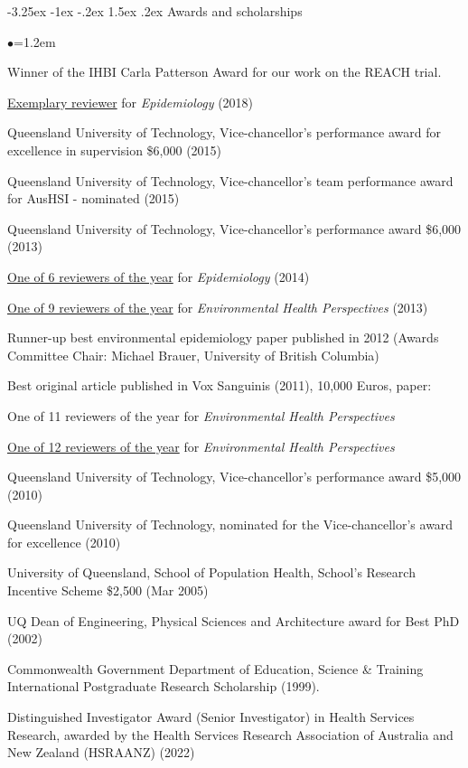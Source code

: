 \documentclass[a4paper,11pt]{article}
\makeatletter
\renewcommand\subsection{\@startsection{subsection}{2}{\z@}%
                                       {-3.25ex \@plus -1ex \@minus -.2ex}%
                                       {1.5ex \@plus .2ex}%
                                   {\normalfont\normalsize\bfseries\color{blue}}}
\renewcommand{\labelitemi}{$\bullet$}
\makeatother
\begin{document}
\begin{raggedright}
\subsection{Awards and scholarships}
\begin{list}{\labelitemi}{\leftmargin=1.2em}\addtolength{\itemsep}{-0.5\baselineskip}
\item Winner of the IHBI Carla Patterson Award for our work on the REACH trial.
\item \href{https://journals.lww.com/epidem/Fulltext/2018/03000/Thanks_to_Our_Reviewers.26.aspx/}{Exemplary reviewer} for \textit{Epidemiology} (2018)
\item Queensland University of Technology, Vice-chancellor's performance award for excellence in supervision \$6,000
(2015)
\item Queensland University of Technology, Vice-chancellor's team performance award for AusHSI - nominated
(2015)
\item Queensland University of Technology, Vice-chancellor's performance award \$6,000
(2013)
\item \href{http://journals.lww.com/epidem/Fulltext/2014/05000/Thanks_to_Our_Reviewers.1.aspx}{One of 6 reviewers of the year} for \textit{Epidemiology} (2014)
\item \href{http://ehp.niehs.nih.gov/122-A37/}{One of 9 reviewers of the year} for \textit{Environmental Health Perspectives} (2013)
\item Runner-up best environmental epidemiology paper published in 2012 (Awards Committee Chair: Michael Brauer, University of British Columbia)  %
\item Best original article published in Vox Sanguinis (2011), 10,000 Euros, paper: 
\item One of 11 reviewers of the year for \textit{Environmental Health Perspectives}
\item \href{http://ehp03.niehs.nih.gov/article/fetchArticle.action?articleURI=info%3Adoi%2F10.1289%2Fehp.119-a59}{One of 12 reviewers of the year} for \textit{Environmental Health Perspectives}
\item Queensland University of Technology, Vice-chancellor's performance award \$5,000
(2010)
\item Queensland University of Technology, nominated for the Vice-chancellor's award for excellence
(2010)
\item University of Queensland, School of Population Health, School's Research Incentive Scheme
\$2,500 (Mar 2005)
\item UQ Dean of Engineering, Physical Sciences and Architecture award for Best PhD (2002)
\item Commonwealth Government Department of Education, Science \& Training International
Postgraduate Research Scholarship (1999).
\item Distinguished Investigator Award (Senior Investigator) in Health Services Research, awarded by the Health Services Research Association of Australia and New Zealand (HSRAANZ) (2022)
\end{list}


\end{raggedright}
\end{document}
